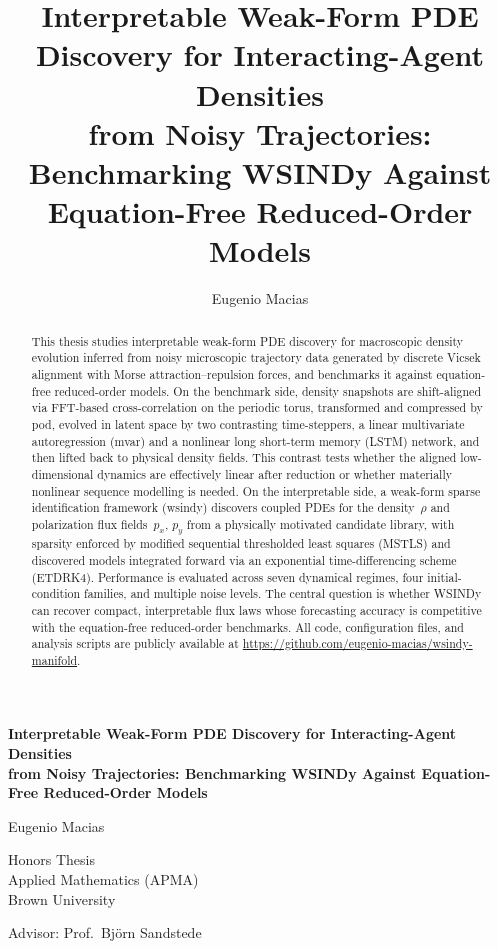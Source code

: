 \documentclass{report}
\title{Interpretable Weak-Form PDE Discovery for Interacting-Agent Densities\\
from Noisy Trajectories: Benchmarking WSINDy Against Equation-Free Reduced-Order Models}
\author{Eugenio Macias}
\date{} %
\theoremstyle{plain}
\theoremstyle{remark}
\numberwithin{equation}{section}              %
\begin{document}
%
%
\begin{titlepage}
\centering

\vspace*{1.2in}

{\LARGE\bfseries
Interpretable Weak-Form PDE Discovery for Interacting-Agent Densities\\
from Noisy Trajectories: Benchmarking WSINDy Against Equation-Free Reduced-Order Models
\par}

\vspace{0.8in}

{\Large Eugenio Macias\par}

\vspace{0.6in}

{\large
Honors Thesis\\
Applied Mathematics (APMA)\\
Brown University
\par}

\vspace{0.5in}

{\large Advisor: Prof.\ Bj\"orn Sandstede\par}

\vfill

%
%

\end{titlepage}
 
%

%
\begin{abstract}
This thesis studies interpretable weak-form PDE discovery for macroscopic density evolution inferred from noisy microscopic trajectory data generated by discrete Vicsek alignment with Morse attraction--repulsion forces, and benchmarks it against equation-free reduced-order models. On the benchmark side, density snapshots are shift-aligned via FFT-based cross-correlation on the periodic torus, transformed and compressed by \gls{pod}, evolved in latent space by two contrasting time-steppers, a linear multivariate autoregression (\gls{mvar}) and a nonlinear long short-term memory (LSTM) network, and then lifted back to physical density fields. This contrast tests whether the aligned low-dimensional dynamics are effectively linear after reduction or whether materially nonlinear sequence modelling is needed. On the interpretable side, a weak-form sparse identification framework (\gls{wsindy}) discovers coupled PDEs for the density~$\rho$ and polarization flux fields~$p_x$, $p_y$ from a physically motivated candidate library, with sparsity enforced by modified sequential thresholded least squares (MSTLS) and discovered models integrated forward via an exponential time-differencing scheme (ETDRK4). Performance is evaluated across seven dynamical regimes, four initial-condition families, and multiple noise levels. The central question is whether WSINDy can recover compact, interpretable flux laws whose forecasting accuracy is competitive with the equation-free reduced-order benchmarks. All code, configuration files, and analysis scripts are publicly available at \url{https://github.com/eugenio-macias/wsindy-manifold}.
\end{abstract}
 
\end{document}
